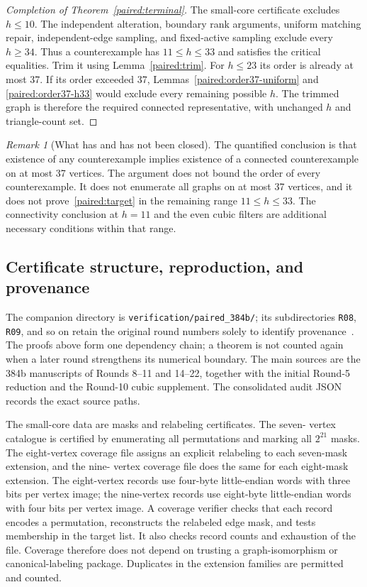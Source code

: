 \documentclass[11pt,a4paper]{article}
\theoremstyle{definition}\newtheorem{definition}[theorem]{Definition}
\theoremstyle{remark}\newtheorem{remark}[theorem]{Remark}
\begin{document}
\begin{proof}[Completion of Theorem~\ref{paired:terminal}]
The small-core certificate excludes $h\le10$. The independent
alteration, boundary rank arguments, uniform matching repair,
independent-edge sampling, and fixed-active sampling exclude every
$h\ge34$. Thus a counterexample has $11\le h\le33$ and satisfies
the critical equalities. Trim it using Lemma~\ref{paired:trim}. For
$h\le23$ its order is already at most 37. If its order exceeded
37, Lemmas~\ref{paired:order37-uniform} and
\ref{paired:order37-h33} would exclude every remaining possible
$h$. The trimmed graph is therefore the required connected
representative, with unchanged $h$ and triangle-count set.
\end{proof}

\begin{remark}[What has and has not been closed]\label{paired:scope}
The quantified conclusion is that existence of any counterexample
implies existence of a connected counterexample on at most 37 vertices.
The argument does not bound the order of every counterexample. It
does not enumerate all graphs on at most 37 vertices, and it does
not prove~\eqref{paired:target} in the remaining range $11\le h\le33$.
The connectivity conclusion at $h=11$ and the even cubic filters
are additional necessary conditions within that range.
\end{remark}

\subsection{Certificate structure, reproduction, and provenance}
\label{paired:repro}

The companion directory is \nolinkurl{verification/paired_384b/};
its subdirectories \nolinkurl{R08}, \nolinkurl{R09}, and so on retain
the original round numbers solely to identify provenance~\cite{paired:archive}. The proofs
above form one dependency chain; a theorem is not counted again
when a later round strengthens its numerical boundary. The main
sources are the 384b manuscripts of Rounds 8--11 and 14--22, together
with the initial Round-5 reduction and the Round-10 cubic supplement.
The consolidated audit JSON records the exact source paths.

The small-core data are masks and relabeling certificates. The seven-
vertex catalogue is certified by enumerating all permutations and
marking all $2^{21}$ masks. The eight-vertex coverage file assigns
an explicit relabeling to each seven-mask extension, and the nine-
vertex coverage file does the same for each eight-mask extension.
The eight-vertex records use four-byte little-endian words with three
bits per vertex image; the nine-vertex records use eight-byte
little-endian words with four bits per vertex image. A coverage verifier checks that
each record encodes a permutation, reconstructs the relabeled edge
mask, and tests membership in the target list. It also checks record
counts and exhaustion of the file. Coverage therefore does not
depend on trusting a graph-isomorphism or canonical-labeling package.
Duplicates in the extension families are permitted and counted.
\end{document}
